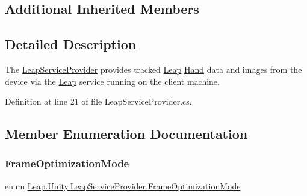 \subsection*{Additional Inherited Members}


\subsection{Detailed Description}
The \mbox{\hyperlink{class_leap_1_1_unity_1_1_leap_service_provider}{Leap\+Service\+Provider}} provides tracked \mbox{\hyperlink{namespace_leap_1_1_unity_1_1_leap}{Leap}} \mbox{\hyperlink{class_leap_1_1_hand}{Hand}} data and images from the device via the \mbox{\hyperlink{namespace_leap_1_1_unity_1_1_leap}{Leap}} service running on the client machine. 



Definition at line 21 of file Leap\+Service\+Provider.\+cs.



\subsection{Member Enumeration Documentation}
\mbox{\label{class_leap_1_1_unity_1_1_leap_service_provider_aded29faa9adf0b09e63a1659e5b0f82d}} 
\subsubsection{\texorpdfstring{FrameOptimizationMode}{FrameOptimizationMode}}
{\footnotesize\ttfamily enum \mbox{\hyperlink{class_leap_1_1_unity_1_1_leap_service_provider_aded29faa9adf0b09e63a1659e5b0f82d}{Leap.\+Unity.\+Leap\+Service\+Provider.\+Frame\+Optimization\+Mode}}\hspace{0.3cm}{\ttfamily [strong]}}

